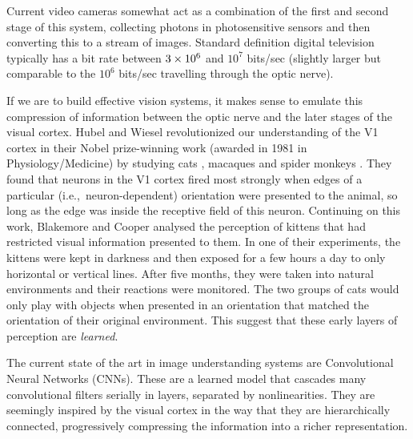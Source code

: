 Current video cameras somewhat act as a combination of the first and second
stage of this system, collecting photons in photosensitive sensors and then
converting this to a stream of images. Standard definition digital television
typically has
a bit rate between $3\times 10^6$ and $10^7$ bits/sec (slightly larger but comparable
to the $10^6$ bits/sec travelling through the optic nerve).

If we are to build effective vision systems, it makes sense to emulate this
compression of information between the optic nerve and the later stages of the visual
cortex.
Hubel and Wiesel revolutionized our understanding of the V1 cortex in their Nobel prize-winning work
(awarded in 1981 in Physiology/Medicine) by
studying cats \cite{hubel_receptive_1959, hubel_receptive_1962}, macaques and spider
monkeys \cite{hubel_receptive_1968}. They found that neurons in the V1 cortex fired
most strongly when edges of a particular (i.e.,\ neuron-dependent) orientation
were presented to the animal, so long as the edge was inside the receptive field of
this neuron.
Continuing on this work, Blakemore and Cooper \cite{blakemore_development_1970}
analysed the perception of kittens that had restricted visual information
presented to them.
In one of their experiments, the kittens were kept in darkness
and then exposed for a few hours a day to only horizontal or vertical lines.
After five months, they were taken into natural environments and their reactions
were monitored. The two groups of cats would only play with objects when
presented in an orientation that matched the orientation of their original
environment. This suggest that these early layers of perception are
\emph{learned}.

The current state of the art in image understanding systems are
Convolutional Neural Networks (CNNs). These are a learned model that
cascades many convolutional filters serially in layers, separated by
nonlinearities.
They are seemingly inspired by the visual cortex in the way that they are
hierarchically connected, progressively compressing the information into a
richer representation.

